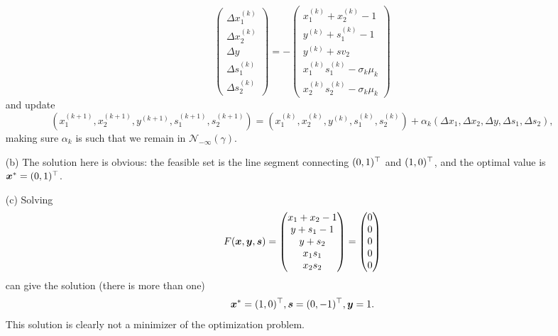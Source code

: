 \documentclass{article}
\begin{document}
\begin{itemize}
\begin{equation*}
                              \begin{pmatrix}
                               \Delta x^{(k)}_1\\ \Delta x^{(k)}_2 \\ \Delta y\\ \Delta s^{(k)}_1 \\ \Delta s^{(k)}_2
                              \end{pmatrix}=
-\begin{pmatrix}
                               x^{(k)}_1+x^{(k)}_2-1\\
                               y^{(k)} +s^{(k)}_1-1\\
                               y^{(k)}+sv_2\\
                               x^{(k)}_1s^{(k)}_1-\sigma_k\mu_k\\
                               x^{(k)}_2s^{(k)}_2-\sigma_k\mu_k
                              \end{pmatrix}
\end{equation*}
and update
\begin{equation*}
 (x_1^{(k+1)},x_2^{(k+1)},y^{(k+1)},s_1^{(k+1)},s_2^{(k+1)}) =  (x_1^{(k)},x_2^{(k)},y^{(k)},s_1^{(k)},s_2^{(k)})+\alpha_k (\Delta x_1,\Delta x_2,\Delta y, \Delta s_1,\Delta s_2),
\end{equation*}
making sure $\alpha_k$ is such that we remain in $\mathcal{N}_{-\infty}(\gamma)$. 
\item[(b)] The solution here is obvious: the feasible set is the line segment connecting $(0,1)^{\top}$ and $(1,0)^{\top}$, and the optimal value is $\bm{x}^*=(0,1)^{\top}$.
\item[(c)] Solving
\begin{equation*}
 F(\bm{x},\bm{y},\bm{s}) = \begin{pmatrix}
                               x_1+x_2-1\\
                               y +s_1-1\\
                               y+s_2\\
                               x_1s_1\\
                               x_2s_2
                              \end{pmatrix}=
                              \begin{pmatrix}
                               0\\0\\0\\0\\0
                              \end{pmatrix}
\end{equation*}
can give the solution (there is more than one)
\begin{equation*}
 \bm{x}^* = (1,0)^{\top}, \bm{s}=(0,-1)^{\top}, \bm{y} = 1.
\end{equation*}
This solution is clearly not a minimizer of the optimization problem.
\end{itemize}
\end{document}
